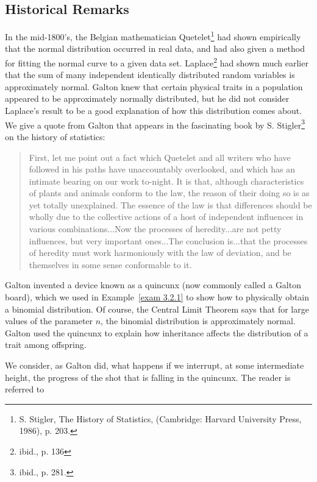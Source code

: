 \subsection*{Historical Remarks}
In the mid-1800's, the Belgian mathematician Quetelet\footnote{S. Stigler, \emx 
{The History of Statistics,} (Cambridge: Harvard University Press, 1986), p. 203.} had shown empirically
that the normal distribution occurred in real data, and had also given a method for fitting the normal
curve to a given data set.  Laplace\footnote{ibid., p. 136} had
shown much earlier that the sum of many independent identically distributed random variables is
approximately normal.  Galton knew that certain physical traits in a population
appeared to be approximately normally distributed, but he did not consider Laplace's result to be
a good explanation of how this distribution comes about.  We give a quote from Galton that appears
in the fascinating book by S. Stigler\footnote{ibid., p. 281.} on
the history of statistics:
\begin{quote}
First, let me point out a fact which Quetelet and all writers who have followed in his paths
have unaccountably overlooked, and which has an intimate bearing on our work to-night.  It is
that, although characteristics of plants and animals conform to the law, the reason of their
doing so is as yet totally unexplained.  The essence of the law is that differences should be
wholly due to the collective actions of a host of independent  influences in various
combinations...Now the processes of heredity...are not petty influences, but very important
ones...The conclusion is...that the processes of heredity must work harmoniously with the law of
deviation, and be themselves in some sense conformable to it.
\end{quote}
\par
Galton invented a device known as a quincunx (now commonly called a Galton
board), which we used in Example~\ref{exam 3.2.1} to show how to physically
obtain a binomial distribution.  Of course, the Central Limit Theorem says that for large values
of the parameter $n$, the binomial distribution is approximately normal.  Galton used the
quincunx to explain how inheritance affects the distribution of a trait among offspring.
\par
We consider, as Galton did, what happens if we interrupt, at some intermediate height, the
progress of the shot that is falling in the quincunx.  The reader is referred to 
